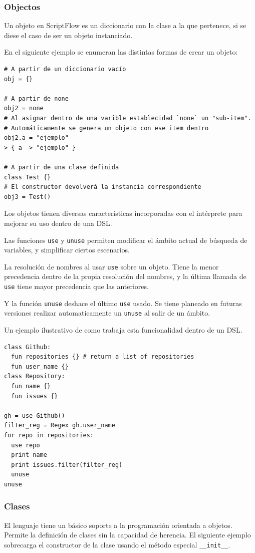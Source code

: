 \documentclass[11pt]{article}
\begin{document}
\subsubsection{Objectos}
\label{sec:org8c3a883}
Un objeto en ScriptFlow es un diccionario con la clase a la que pertenece, si se diese el caso de ser
un objeto instanciado.

En el siguiente ejemplo se enumeran las distintas formas de crear un objeto:

\begin{verbatim}
# A partir de un diccionario vacío
obj = {}

# A partir de none
obj2 = none
# Al asignar dentro de una varible establecidad `none` un "sub-item".
# Automáticamente se genera un objeto con ese item dentro
obj2.a = "ejemplo"
> { a -> "ejemplo" }

# A partir de una clase definida
class Test {}
# El constructor devolverá la instancia correspondiente
obj3 = Test()
\end{verbatim}

Los objetos tienen diversas características incorporadas con el intérprete para mejorar su uso dentro de una DSL.

Las funciones \texttt{use} y \texttt{unuse} permiten modificar el ámbito actual de búsqueda de variables, y simplificar ciertos escenarios.

La resolución de nombres al usar \texttt{use} sobre un objeto. Tiene la menor precedencia dentro de la propia resolución del nombres, y
la última llamada de \texttt{use} tiene mayor precedencia que las anteriores.

Y la función \texttt{unuse} deshace el último \texttt{use} usado. Se tiene planeado en futuras versiones realizar automaticamente un \texttt{unuse} al salir de un ámbito.

Un ejemplo ilustrativo de como trabaja esta funcionalidad dentro de un DSL.

\begin{verbatim}
class Github:
  fun repositories {} # return a list of repositories
  fun user_name {}
class Repository:
  fun name {}
  fun issues {}

gh = use Github()
filter_reg = Regex gh.user_name
for repo in repositories:
  use repo
  print name
  print issues.filter(filter_reg)
  unuse
unuse
\end{verbatim}

\subsubsection{Clases}
\label{sec:org2b3177b}
El lenguaje tiene un básico soporte a la programación orientada a objetos. Permite la definición
de clases sin la capacidad de herencia. El siguiente ejemplo sobrecarga el constructor de la clase
usando el método especial \texttt{\_\_init\_\_}.
\end{document}
